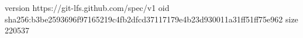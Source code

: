 version https://git-lfs.github.com/spec/v1
oid sha256:b3be2593696f97165219c4fb2dfcd37117179e4b23d930011a31ff51ff75e962
size 220537
